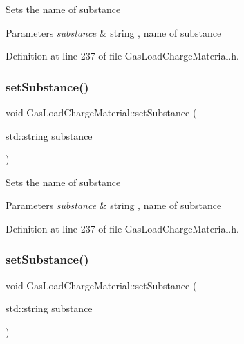 Sets the name of substance 
\begin{DoxyParams}{Parameters}
{\em substance} & string , name of substance \\
\hline
\end{DoxyParams}


Definition at line 237 of file Gas\+Load\+Charge\+Material.\+h.

\mbox{\label{class_gas_load_charge_material_a20cc3df601d8daae9b8f8e7b0c53c2e3}} 
\subsubsection{\texorpdfstring{set\+Substance()}{setSubstance()}\hspace{0.1cm}{\footnotesize\ttfamily [2/3]}}
{\footnotesize\ttfamily void Gas\+Load\+Charge\+Material\+::set\+Substance (\begin{DoxyParamCaption}\item[{std\+::string}]{substance }\end{DoxyParamCaption})\hspace{0.3cm}{\ttfamily [inline]}}

Sets the name of substance 
\begin{DoxyParams}{Parameters}
{\em substance} & string , name of substance \\
\hline
\end{DoxyParams}


Definition at line 237 of file Gas\+Load\+Charge\+Material.\+h.

\mbox{\label{class_gas_load_charge_material_a20cc3df601d8daae9b8f8e7b0c53c2e3}} 
\subsubsection{\texorpdfstring{set\+Substance()}{setSubstance()}\hspace{0.1cm}{\footnotesize\ttfamily [3/3]}}
{\footnotesize\ttfamily void Gas\+Load\+Charge\+Material\+::set\+Substance (\begin{DoxyParamCaption}\item[{std\+::string}]{substance }\end{DoxyParamCaption})\hspace{0.3cm}{\ttfamily [inline]}}

